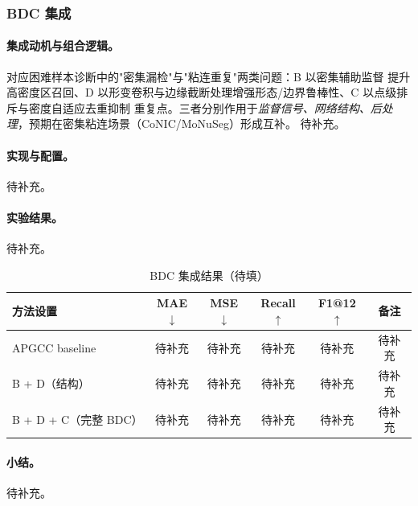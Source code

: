 \subsubsection{BDC 集成}

\paragraph{集成动机与组合逻辑。}对应困难样本诊断中的"密集漏检"与"粘连重复"两类问题：B 以密集辅助监督
提升高密度区召回、D 以形变卷积与边缘截断处理增强形态/边界鲁棒性、C 以点级排斥与密度自适应去重抑制
重复点。三者分别作用于\emph{监督信号、网络结构、后处理}，预期在密集粘连场景（CoNIC/MoNuSeg）形成互补。%
待补充。

\paragraph{实现与配置。}%
待补充。

\paragraph{实验结果。}%
待补充。

\begin{table}[H]
    \centering
    \caption{BDC 集成结果（待填）}
    \label{tab:BDC-main}
    \small
    \begin{tabular}{lccccc}
        \toprule
        方法设置 & MAE$\downarrow$ & MSE$\downarrow$ & Recall$\uparrow$ & F1@12$\uparrow$ & 备注 \\
        \midrule
        APGCC baseline       & 待补充 & 待补充 & 待补充 & 待补充 & 待补充 \\
        B + D（结构）         & 待补充 & 待补充 & 待补充 & 待补充 & 待补充 \\
        B + D + C（完整 BDC） & 待补充 & 待补充 & 待补充 & 待补充 & 待补充 \\
        \bottomrule
    \end{tabular}
\end{table}

\paragraph{小结。}%
待补充。
